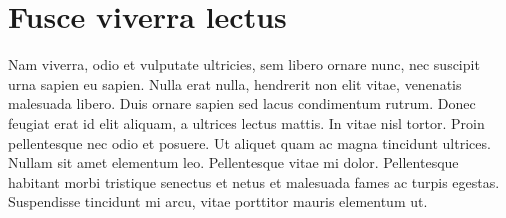 \chapter{Fusce viverra lectus}\label{app:one}


Nam viverra, odio et vulputate ultricies, sem libero ornare nunc, nec suscipit urna sapien eu sapien. Nulla erat nulla, hendrerit non elit vitae, venenatis malesuada libero. Duis ornare sapien sed lacus condimentum rutrum. Donec feugiat erat id elit aliquam, a ultrices lectus mattis. In vitae nisl tortor. Proin pellentesque nec odio et posuere. Ut aliquet quam ac magna tincidunt ultrices. Nullam sit amet elementum leo. Pellentesque vitae mi dolor. Pellentesque habitant morbi tristique senectus et netus et malesuada fames ac turpis egestas. Suspendisse tincidunt mi arcu, vitae porttitor mauris elementum ut.